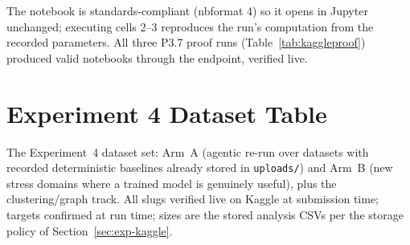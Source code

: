 The notebook is standards-compliant (nbformat 4) so it opens in Jupyter unchanged; executing cells 2--3 reproduces the run's computation from the recorded parameters. All three P3.7 proof runs (Table~\ref{tab:kaggleproof}) produced valid notebooks through the endpoint, verified live.

\chapter{Experiment 4 Dataset Table}
\label{anx:exp4datasets}

The Experiment~4 dataset set: Arm~A (agentic re-run over datasets with recorded deterministic baselines already stored in \texttt{uploads/}) and Arm~B (new stress domains where a trained model is genuinely useful), plus the clustering/graph track. All slugs verified live on Kaggle at submission time; targets confirmed at run time; sizes are the stored analysis CSVs per the storage policy of Section~\ref{sec:exp-kaggle}.

